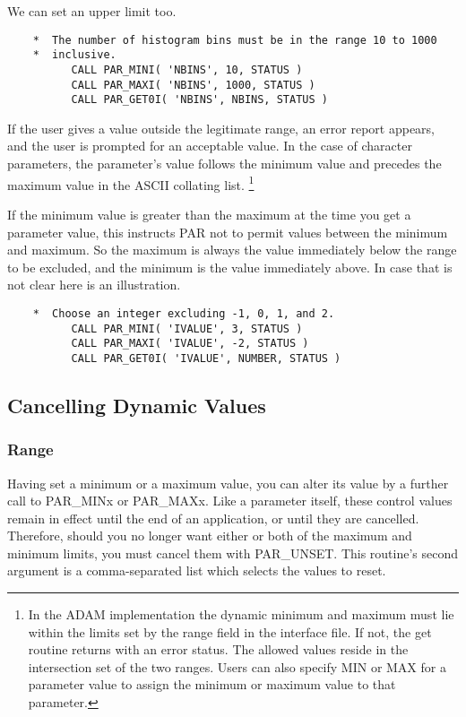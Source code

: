 \documentclass[twoside,11pt]{article}
\newcommand{\xlabel}[1]{}
\begin{document}
We can set an upper limit too.
\begin{verbatim}
    *  The number of histogram bins must be in the range 10 to 1000
    *  inclusive.
          CALL PAR_MINI( 'NBINS', 10, STATUS )
          CALL PAR_MAXI( 'NBINS', 1000, STATUS )
          CALL PAR_GET0I( 'NBINS', NBINS, STATUS )
\end{verbatim}

If the user gives a value outside the legitimate range, an error report
appears, and the user is prompted for an acceptable value. In the case
of character parameters, the parameter's value follows the minimum value
and precedes the maximum value in the ASCII collating list. \footnote{In
the ADAM implementation the dynamic minimum and maximum must lie within
the limits set by the range field in the interface file.  If not,
the get routine returns with an error status.  The allowed values reside
in the intersection set of the two ranges.  Users can also specify MIN
or MAX for a parameter value to assign the minimum or maximum value to
that parameter.} 

If the minimum value is greater than the maximum at the time you
get a parameter value, this instructs PAR not to permit values between
the minimum and maximum.  So the maximum is always the value immediately
below the range to be excluded, and the minimum is the value immediately
above.  In case that is not clear here is an illustration.

\begin{verbatim}
    *  Choose an integer excluding -1, 0, 1, and 2.
          CALL PAR_MINI( 'IVALUE', 3, STATUS )
          CALL PAR_MAXI( 'IVALUE', -2, STATUS )
          CALL PAR_GET0I( 'IVALUE', NUMBER, STATUS )
\end{verbatim}

\subsection{\xlabel{cancelling_dynamic_values}Cancelling Dynamic Values}

\subsubsection{Range}

Having set a minimum or a maximum value, you can alter its value by a
further call to PAR\_MINx or PAR\_MAXx.  Like a parameter itself, these
control values remain in effect until the end of an application, or
until they are cancelled.  Therefore, should you no longer want either 
or both of the maximum and minimum limits, you must cancel them with
PAR\_UNSET.  This routine's second argument is a comma-separated list
which selects the values to reset.
\end{document}

